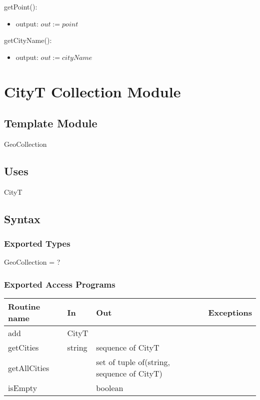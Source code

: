 \documentclass[12pt]{article}
\begin{document}
\noindent getPoint():
\begin{itemize}
\item output: $\mathit{out} := point$ 
\end{itemize}

\noindent getCityName():
\begin{itemize}
\item output: $\mathit{out} := cityName$
\end{itemize}





\newpage

\section* {CityT Collection Module}

\subsection* {Template Module}

GeoCollection

\subsection* {Uses}

CityT

\subsection* {Syntax}

\subsubsection* {Exported Types}

GeoCollection = ?


\subsubsection* {Exported Access Programs}

\begin{tabular}{| l | l | l | p{6cm} |}
\hline
\textbf{Routine name} & \textbf{In} & \textbf{Out} & \textbf{Exceptions}\\
\hline
add & CityT &  & \\
\hline
getCities & string & sequence of CityT & \\
\hline
getAllCities &  & set of tuple of(string, sequence of CityT)& \\
\hline
isEmpty &  & boolean& \\
\hline
\end{tabular}
\end{document}
